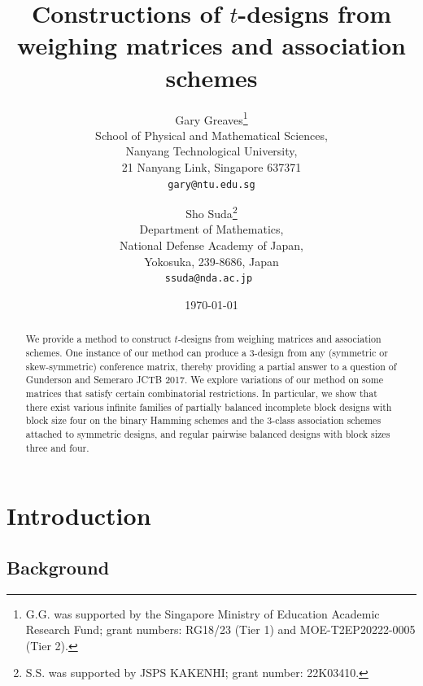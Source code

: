 \documentclass[11pt]{article}
\title{Constructions of $t$-designs from \\ weighing matrices and association schemes}
\author{ Gary Greaves\thanks{G.G. was supported by  the Singapore
Ministry of Education Academic Research Fund;  grant numbers: RG18/23 (Tier 1) and MOE-T2EP20222-0005 (Tier 2). %
}\\
  School of Physical and Mathematical Sciences, \\
  Nanyang Technological University, \\
   21 Nanyang Link, Singapore 637371\\
  {\tt gary@ntu.edu.sg}
\and
 Sho Suda\thanks{S.S. was supported by JSPS KAKENHI; grant number: 22K03410. 
 } \\
 Department of Mathematics, \\  National Defense Academy of Japan, \\ Yokosuka, 239-8686, Japan \\
 \tt{ssuda@nda.ac.jp}
}
\date{\today}
\begin{document}
\maketitle
\begin{abstract}
    We provide a method to construct $t$-designs from weighing matrices and association schemes.
    One instance of our method can produce a $3$-design from any (symmetric or skew-symmetric) conference matrix, %
    thereby providing a partial answer to a question of Gunderson and Semeraro JCTB 2017.
    We explore variations of our method on some matrices that satisfy certain combinatorial restrictions.
    In particular, we show that there exist various infinite families of partially balanced incomplete block designs with block size four on the binary Hamming schemes and the $3$-class association schemes attached to symmetric designs, and regular pairwise balanced designs with block sizes three and four. 
\end{abstract}



\section{Introduction}

\subsection{Background}
\end{document}
